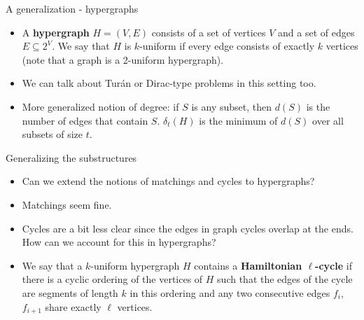 \documentclass{beamer}
\theoremstyle{plain}
\begin{document}
	\begin{frame}{A generalization - hypergraphs}
		\begin{itemize}
			\item A \textbf{hypergraph} $H = (V, E)$ consists of a set of vertices $V$ and a set of edges $E\subseteq 2^V$.
			We say that $H$ is $k$-uniform if every edge consists of exactly $k$ vertices (note that a graph is a 2-uniform hypergraph).

			\pause

			\item We can talk about Tur\'an or Dirac-type problems in this setting too.

			\pause

			\item More generalized notion of degree: if $S$ is any subset, then $d(S)$ is the number of edges that contain $S$.
			$\delta_t(H)$ is the minimum of $d(S)$ over all subsets of size $t$.
		\end{itemize}
	\end{frame}


	\begin{frame}{Generalizing the substructures}
		\begin{itemize}
			\item Can we extend the notions of matchings and cycles to hypergraphs?

			\pause

			\item Matchings seem fine.

			\pause

			\item Cycles are a bit less clear since the edges in graph cycles overlap at the ends.
			How can we account for this in hypergraphs?

			\pause

			\item We say that a $k$-uniform hypergraph $H$ contains a \textbf{Hamiltonian $\ell$-cycle} if there is a cyclic ordering of the vertices of $H$ such that the edges of the cycle are segments of length $k$ in this ordering and any two consecutive edges $f_i$, $f_{i+1}$ share exactly $\ell$ vertices.
		\end{itemize}
	\end{frame}
\end{document}
